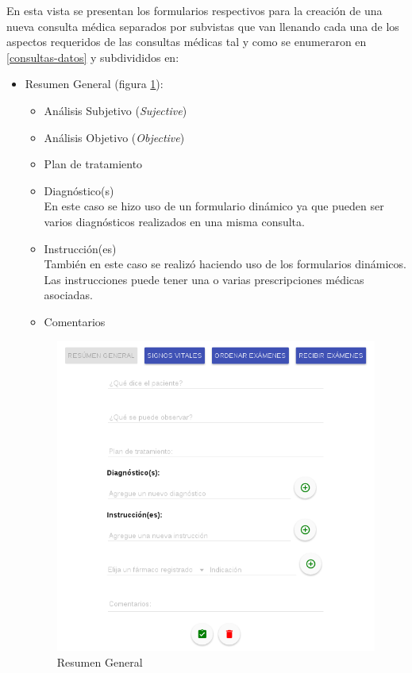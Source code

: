     En esta vista se presentan los formularios respectivos para la creación de una nueva consulta médica separados por subvistas que van llenando cada una de los aspectos requeridos de las consultas médicas tal y como se enumeraron en \ref{consultas-datos} y subdivididos en:
    
    \begin{itemize}
        \item Resumen General (figura \ref{img-revisiongeneral}):
            \begin{itemize}
                \item Análisis Subjetivo (\textit{Sujective})
                \item Análisis Objetivo (\textit{Objective})
                \item Plan de tratamiento
                \item Diagnóstico(s)\\
                En este caso se hizo uso de un formulario dinámico ya que pueden ser varios diagnósticos realizados en una misma consulta.
                \item Instrucción(es)\\
                También en este caso se realizó haciendo uso de los formularios dinámicos. Las instrucciones puede tener una o varias prescripciones médicas asociadas.
                \item Comentarios
            \end{itemize}
            
            \begin{figure}[htb!]
                \begin{center}
                    \includegraphics[width=.75\textwidth,keepaspectratio=true]{figures/consulta1}
                \end{center}
                \caption{Resumen General}
                \label{img-revisiongeneral}
            \end{figure}
                

\end{itemize}

